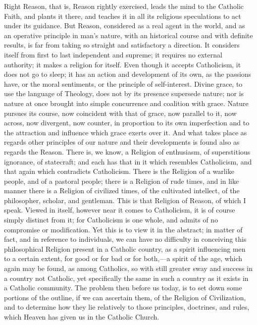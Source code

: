 Right Reason, that is, Reason rightly exercised, leads the mind to
the Catholic Faith, and plants it there, and teaches it in all its
religious speculations to act under its guidance. But Reason,
considered as a real agent in the world, and as an operative principle
in man's nature, with an historical course and with definite results,
is far from taking so straight and satisfactory a direction. It
considers itself from first to last independent and supreme; it
requires no external authority; it makes a religion for itself. Even
though it accepts Catholicism, it does not go to sleep; it has an
action and development of its own, as the passions have, or the moral
sentiments, or the principle of self-interest. Divine grace, to use
the language of Theology, does not by its presence supersede nature;
nor is nature at once brought into simple concurrence and coalition
with grace. Nature pursues its course, now coincident with that of
grace, now parallel to it, now across, now divergent, now counter, in
proportion to its own imperfection and to the attraction and influence
which grace exerts over it. And what takes place as regards other
principles of our nature and their developments is found also as
regards the Reason. There is, we know, a Religion of enthusiasm, of
superstitious ignorance, of statecraft; and each has that in it
which resembles Catholicism, and that again which contradicts
Catholicism. There is the Religion of a warlike people, and of a
pastoral people; there is a Religion of rude times, and in like manner
there is a Religion of civilized times, of the cultivated intellect,
of the philosopher, scholar, and gentleman. This is that Religion of
Reason, of which I speak. Viewed in itself, however near it comes to
Catholicism, it is of course simply distinct from it; for Catholicism
is one whole, and admits of no compromise or modification. Yet this is
to view it in the abstract; in matter of fact, and in reference to
individuals, we can have no difficulty in conceiving this
philosophical Religion present in a Catholic country, as a spirit
influencing men to a certain extent, for good or for bad or for both,—a
spirit of the age, which again may be found, as among Catholics, so
with still greater sway and success in a country not Catholic, yet
specifically the same in such a country as it exists in a Catholic
community. The problem then before us today, is to set down some
portions of the outline, if we can ascertain them, of the Religion of
Civilization, and to determine how they lie relatively to those
principles, doctrines, and rules, which Heaven has given us in the
Catholic Church.

